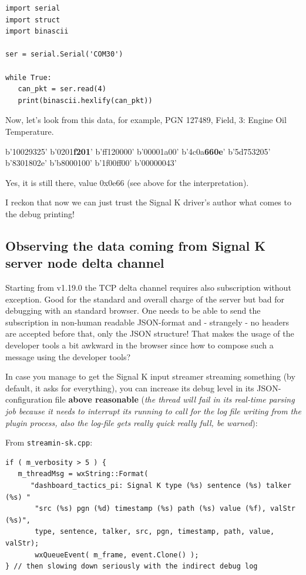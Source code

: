 \documentclass[11pt]{article}
\begin{document}
    \begin{verbatim}
import serial
import struct
import binascii

ser = serial.Serial('COM30')

while True:
   can_pkt = ser.read(4)
   print(binascii.hexlify(can_pkt))
\end{verbatim}

    Now, let's look from this data, for example, PGN 127489, Field, 3:
Engine Oil Temperature.

    b'10029325' b'0201\textbf{f201}' b'ff120000' b'00001a00'
b'4c0a\textbf{660e}' b'5d753205' b'8301802e' b'b8000100' b'1f00ff00'
b'00000043'

    Yes, it is still there, value 0x0e66 (see above for the interpretation).

    I reckon that now we can just trust the Signal K driver's author what
comes to the debug printing!

    \hypertarget{observing-the-data-coming-from-signal-k-server-node-delta-channel}{%
\subsection{Observing the data coming from Signal K server node delta
channel}\label{observing-the-data-coming-from-signal-k-server-node-delta-channel}}

    Starting from v1.19.0 the TCP delta channel requires also subscription
without exception. Good for the standard and overall charge of the
server but bad for debugging with an standard browser. One needs to be
able to send the subscription in non-human readable JSON-format and -
strangely - no headers are accepted before that, only the JSON
structure! That makes the usage of the developer tools a bit awkward in
the browser since how to compose such a message using the developer
tools?

    In case you manage to get the Signal K input streamer streaming
something (by default, it asks for everything), you can increase its
debug level in its JSON-configuration file \textbf{above reasonable}
(\emph{the thread will fail in its real-time parsing job because it
needs to interrupt its running to call for the log file writing from the
plugin process, also the log-file gets really quick really full, be
warned}):

    From \texttt{streamin-sk.cpp}:

\begin{verbatim}
if ( m_verbosity > 5 ) {
   m_threadMsg = wxString::Format(
      "dashboard_tactics_pi: Signal K type (%s) sentence (%s) talker (%s) "
       "src (%s) pgn (%d) timestamp (%s) path (%s) value (%f), valStr (%s)",
       type, sentence, talker, src, pgn, timestamp, path, value, valStr);
       wxQueueEvent( m_frame, event.Clone() );
} // then slowing down seriously with the indirect debug log
\end{verbatim}
\end{document}
